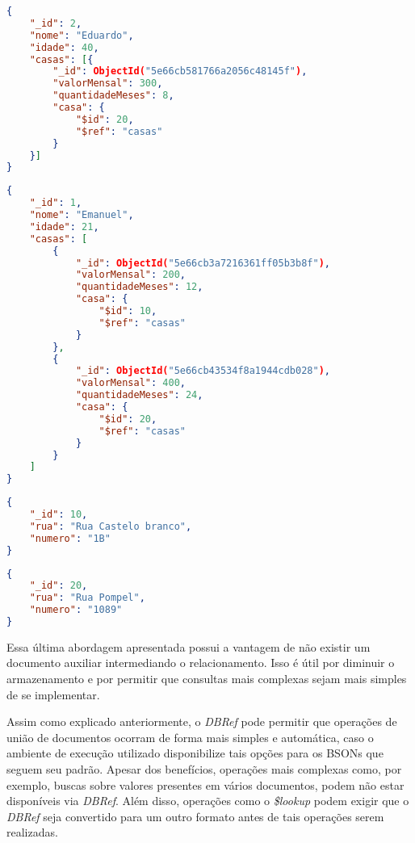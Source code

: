 \begin{lstlisting}[language=json, caption={Documento da Pessoa \textit{Eduardo}}]
{
    "_id": 2,
    "nome": "Eduardo",
    "idade": 40,
    "casas": [{
        "_id": ObjectId("5e66cb581766a2056c48145f"),
        "valorMensal": 300,
        "quantidadeMeses": 8,
        "casa": {
            "$id": 20,
            "$ref": "casas"
        }
    }]
}
\end{lstlisting}

\begin{lstlisting}[language=json, caption={Documento da Pessoa \textit{Emanuel}}]
{
    "_id": 1,
    "nome": "Emanuel",
    "idade": 21,
    "casas": [
        {
            "_id": ObjectId("5e66cb3a7216361ff05b3b8f"),
            "valorMensal": 200,
            "quantidadeMeses": 12,
            "casa": {
                "$id": 10,
                "$ref": "casas"
            }
        },
        {
            "_id": ObjectId("5e66cb43534f8a1944cdb028"),
            "valorMensal": 400,
            "quantidadeMeses": 24,
            "casa": {
                "$id": 20,
                "$ref": "casas"
            }
        }
    ]
}
\end{lstlisting}

\begin{lstlisting}[language=json, caption={Documento da Casa de Número 1B}]
{
    "_id": 10,
    "rua": "Rua Castelo branco",
    "numero": "1B"
}
\end{lstlisting}

\newpage

\begin{lstlisting}[language=json, caption={Documento da Casa de Número 1089}]
{
    "_id": 20,
    "rua": "Rua Pompel",
    "numero": "1089"
}
\end{lstlisting}

Essa última abordagem apresentada possui a vantagem de não existir um documento auxiliar intermediando o relacionamento. Isso é útil por diminuir o armazenamento e por permitir que consultas mais complexas sejam mais simples de se implementar.

Assim como explicado anteriormente, o \textit{DBRef} pode permitir que operações de união de documentos ocorram de forma mais simples e automática, caso o ambiente de execução utilizado disponibilize tais opções para os BSONs que seguem seu padrão. Apesar dos benefícios, operações mais complexas como, por exemplo, buscas sobre valores presentes em vários documentos, podem não estar disponíveis via \textit{DBRef}. Além disso, operações como o \textit{\$lookup} podem exigir que o \textit{DBRef} seja convertido para um outro formato antes de tais operações serem realizadas. 

